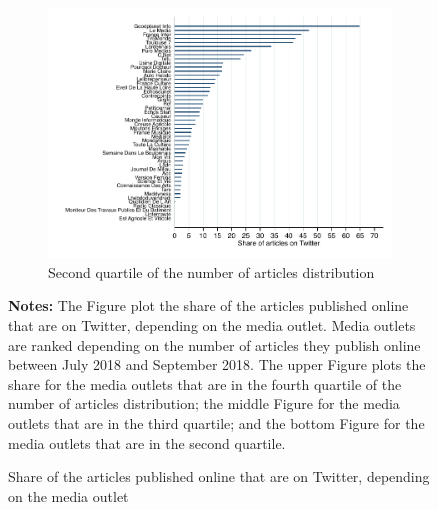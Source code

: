 \begin{figure}
\begin{center}
\begin{subfigure}{1\textwidth}
 	    \label{fig:fig_mean_Tweeted_third_quartile_nb_articles}
\end{subfigure}
\begin{subfigure}{1\textwidth}
 	    \centering
 	    \includegraphics[scale=.6]{figures/fig_mean_Tweeted_second_quartile_nb_articles}
 	    \caption{Second quartile of the number of articles distribution}
 	    \label{fig:fig_mean_Tweeted_second_quartile_nb_articles}
\end{subfigure}
\end{center}
	\begin{spacing}{0.5}
		{\footnotesize \textbf{Notes:} The Figure plot the share of the articles published online that are on Twitter, depending on the media outlet. Media outlets are ranked depending on the number of articles they publish online between July 2018 and September 2018. The upper Figure plots the share for the media outlets that are in the fourth quartile of the number of articles distribution; the middle Figure for the media outlets that are in the third quartile; and the bottom Figure for the media outlets that are in the second quartile.}
	\end{spacing}
\vspace{.5cm}	
	\caption{Share of the articles published online that are on Twitter, depending on the media outlet}
	\label{fig:fig_mean_Tweeted}
\end{figure}


